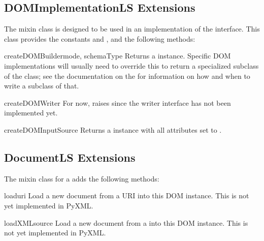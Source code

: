 \documentclass{howto}
\begin{document}
\subsection{DOMImplementationLS Extensions}

The  mixin class is designed to be used in
an implementation of the  interface.  This
class provides the constants  and
, and the following methods:

\begin{methoddesc}[DOMImplementationLS]{createDOMBuilder}{mode, schemaType}
  Returns a  instance.  Specific DOM implementations
  will usually need to override this to return a specialized subclass
  of the  class; see the documentation on the
   for information on how and when to write a
  subclass of that.
\end{methoddesc}

\begin{methoddesc}[DOMImplementationLS]{createDOMWriter}{}
  For now, raises  since the writer
  interface has not been implemented yet.
\end{methoddesc}

\begin{methoddesc}[DOMImplementationLS]{createDOMInputSource}{}
  Returns a  instance with all attributes set to
  .
\end{methoddesc}


\subsection{DocumentLS Extensions}

The  mixin class for a  adds the
following methods:

\begin{methoddesc}[DocumentLS]{load}{uri}
  Load a new document from a URI into this DOM 
  instance.  This is not yet implemented in PyXML.
\end{methoddesc}

\begin{methoddesc}[DocumentLS]{loadXML}{source}
  Load a new document from a  into this DOM
   instance.  This is not yet implemented in PyXML.
\end{methoddesc}
\end{document}
